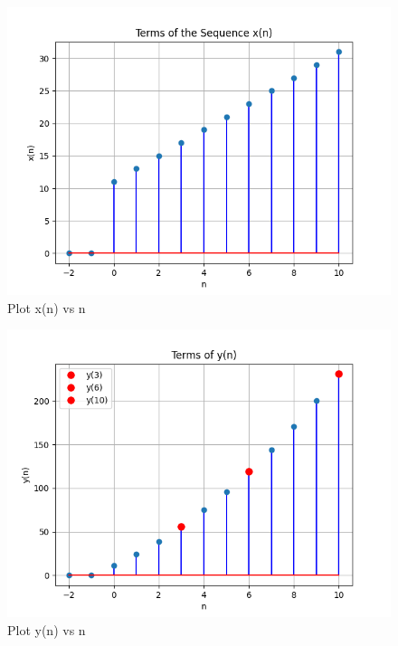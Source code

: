 \documentclass[journal,12pt,twocolumn]{IEEEtran}
\theoremstyle{remark}
\begin{document}
\begin{figure}
    \includegraphics[width=\columnwidth]{figs/fig.png}
    \caption{Plot x(n) vs n}
    \label{fig:enter-label}
\end{figure}

\begin{figure}
    
    \includegraphics[width=\columnwidth]{figs/fig2.png}
    \caption{Plot y(n) vs n}
    \label{fig:enter-label}
\end{figure}
\end{document}
